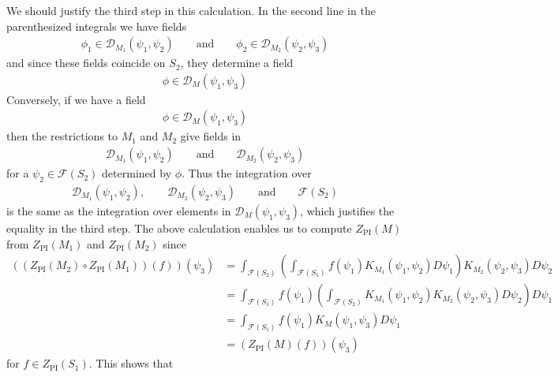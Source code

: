 We should justify the third step in this calculation. In the second line in the parenthesized integrals we have fields
\begin{align*}
  \phi_{1}
  \in
  \mathcal{D}_{M_{1}}(\psi_{1},\psi_{2})
  \qquad
  \text{and}
  \qquad
  \phi_{2}
  \in
  \mathcal{D}_{M_{2}}(\psi_{2},\psi_{3})
\end{align*}
and since these fields coincide on $S_{2}$, they determine a field
\begin{align*}
  \phi
  \in
  \mathcal{D}_{M}(\psi_{1},\psi_{3})
\end{align*}
Conversely, if we have a field
\begin{align*}
  \phi
  \in
  \mathcal{D}_{M}(\psi_{1},\psi_{3})
\end{align*}
then the restrictions to $M_{1}$ and $M_{2}$ give fields in
\begin{align*}
  \mathcal{D}_{M_{1}}(\psi_{1},\psi_{2})
  \qquad
  \text{and}
  \qquad
  \mathcal{D}_{M_{2}}(\psi_{2},\psi_{3})
\end{align*}
for a $\psi_{2} \in \mathcal{F}(S_{2})$ determined by $\phi$. Thus the integration over
\begin{align*}
  \mathcal{D}_{M_{1}}(\psi_{1},\psi_{2})
  ,\qquad
  \mathcal{D}_{M_{2}}(\psi_{2},\psi_{3})
  \qquad
  \text{and}
  \qquad
  \mathcal{F}(S_{2})
\end{align*}
is the same as the integration over elements in $\mathcal{D}_{M}(\psi_{1},\psi_{3})$, which justifies the equality in the third step. The above calculation enables us to compute $Z_{\mathrm{PI}}(M)$ from $Z_{\mathrm{PI}}(M_{1})$ and $Z_{\mathrm{PI}}(M_{2})$ since
\begin{align*}
  \left(
    \left(
      Z_{\mathrm{PI}}(M_{2})
      \circ
      Z_{\mathrm{PI}}(M_{1})
    \right)
    (f)
  \right)
  (\psi_{3})
  &=
  \int_{\mathcal{F}(S_{2})}
  \left(
    \int_{\mathcal{F}(S_{1})}
    f(\psi_{1})
    K_{M_{1}}(\psi_{1},\psi_{2})
    D\psi_{1}
  \right)
  K_{M_{2}}(\psi_{2},\psi_{3})  
  D\psi_{2}
  \\
  &=
  \int_{\mathcal{F}(S_{1})}
  f(\psi_{1})
  \left(
    \int_{\mathcal{F}(S_{2})}
    K_{M_{1}}(\psi_{1},\psi_{2})
    K_{M_{2}}(\psi_{2},\psi_{3})
    D\psi_{2}
  \right)
  D\psi_{1}
  \\
  &=
  \int_{\mathcal{F}(S_{1})}
  f(\psi_{1})
  K_{M}(\psi_{1},\psi_{3})
  D\psi_{1}
  \\
  &=
  \left(
    Z_{\mathrm{PI}}(M)(f)
  \right)
  (\psi_{3})
\end{align*}
for $f \in Z_{\mathrm{PI}}(S_{1})$. This shows that
